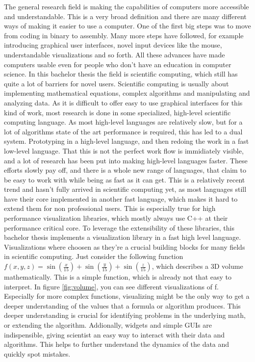 The general research field is making the capabilities of computers more accessible and understandable.
This is a very broad definition and there are many different ways of making it easier to use a computer. 
One of the first big steps was to move from coding in binary to assembly. 
Many more steps have followed, for example introducing graphical user interfaces, novel input devices like the mouse, understandable visualizations and so forth.
All these advances have made computers usable even for people who don't have an education in computer science.
In this bachelor thesis the field is scientific computing, which still has quite a lot of barriers for novel users.
Scientific computing is usually about implementing mathematical equations, complex algorithms and manipulating and analyzing data.
As it is difficult to offer easy to use graphical interfaces for this kind of work, most research is done in some specialized, high-level scientific computing language. As most high-level languages are relatively slow, but for a lot of algorithms state of the art performance is required, this has led to a dual system. Prototyping in a high-level language, and then redoing the work in a fast low-level language.
That this is not the perfect work flow is immidiately visible, and a lot of research has been put into making high-level languages faster.
These efforts slowly pay off, and there is a whole new range of languages, that claim to be easy to work with while being as fast as it can get.
This is a relatively recent trend and hasn't fully arrived in scientific computing yet, as most languages still have their core implemented in another fast language, which makes it hard to extend them for non professional users.
This is especially true for high performance visualization libraries, which mostly always use C++ at their performance critical core.
To leverage the extensibility of these libraries, this bachelor thesis implements a visualization library in a fast high level language.
Visualizations where choosen as they're a crucial building blocks for many fields in scientific computing.
Just consider the following function $f(x,y,z)=\sin(\frac{x}{15})+\sin(\frac{y}{15})+\sin(\frac{z}{15})$, which describes a 3D volume mathematically. 
This is a simple function, which is already not that easy to interpret. In figure \ref{fig:volume}, you can see different visualizations of f. 
Especially for more complex functions, visualizing might be the only way to get a deeper understanding of the values that a formula or algorithm produces.
This deeper understanding is crucial for identifying problems in the underlying math, or extending the algorithm.
Addionally, widgets and simple GUIs are indispensible, giving scientist an easy way to interact with their data and algorithms.
This helps to further understand the dynamics of the data and quickly spot mistakes.

